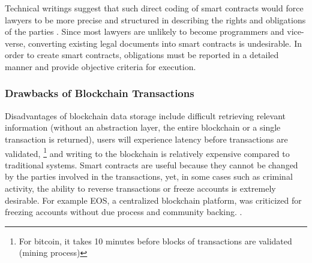 Technical writings suggest
that such direct coding of smart contracts would force lawyers to be more precise and
structured in describing the rights and obligations of the parties \cite{stepWolf}. Since most lawyers are unlikely to become programmers and vice-verse, converting existing legal documents into smart contracts is undesirable. In order to create smart contracts, obligations must be reported in a  detailed manner and provide objective criteria for execution.


\subsubsection{Drawbacks of Blockchain Transactions}

	
Disadvantages of blockchain data storage include difficult retrieving relevant information (without an abstraction layer, the entire blockchain or a single transaction is returned), users will experience latency before transactions are validated, 	\footnote{For bitcoin, it takes 10 minutes before blocks of transactions are validated (mining process)} and writing to the blockchain is relatively expensive compared to traditional systems. Smart contracts are useful because they cannot be changed by the parties involved in the transactions, yet, in some cases such as criminal activity, the ability to reverse transactions or freeze accounts is extremely desirable. For example EOS, a centralized blockchain platform, was criticized for freezing accounts without due process and community backing. \cite{EOS:Online}.



\newpage
%
%